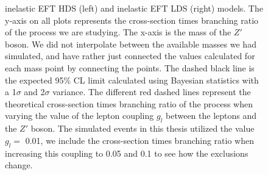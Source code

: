 \documentclass[12pt, a4paper]{book}
\begin{document}
\begin{figure}[!ht]
{   inelastic EFT HDS (left) and inelastic EFT LDS (right) models.
   The y-axis on all plots represents the cross-section times branching ratio of the process we are studying. The x-axis is the mass of the $Z'$ boson. We did not interpolate between the available masses we had simulated, 
   and have rather just connected the values calculated for each mass point by connecting the points. The dashed black line is the expected 95\% CL limit calculated using Bayesian statistics with a 1$\sigma$ and 2$\sigma$ variance. 
   The different red dashed lines represent the theoretical cross-section times branching ratio of the process when varying the value of the lepton coupling $g_l$ between the leptons and the $Z'$ boson. The simulated events in this thesis utilized the value $g_l=$ 0.01, we include the cross-section times branching ratio when increasing this coupling to 0.05 and 0.1 to see how the exclusions change. 
   }\label{fig:model_dep_mono_Zp_excl}
\end{figure}



\clearpage
\end{document}
